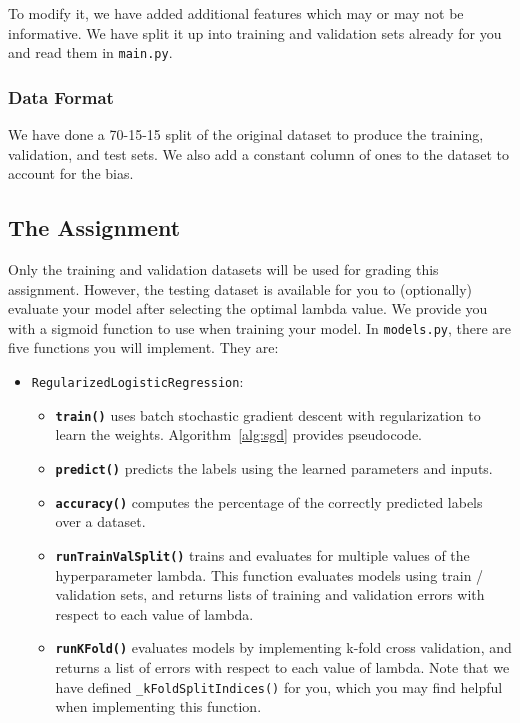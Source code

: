 \documentclass{article}
\begin{document}
To modify it, we have added additional features which may or may not be informative. We have split it up into training and validation sets already for you and read them in \texttt{main.py}.

\subsubsection*{Data Format}

We have done a 70-15-15 split of the original dataset to produce the training, validation, and test sets. We also add a constant column of ones to the dataset to account for the bias.

\subsection*{The Assignment}
Only the training and validation datasets will be used for grading this assignment. However, the testing dataset is available for you to (optionally) evaluate your model after selecting the optimal lambda value.
We provide you with a sigmoid function to use when training your model. In \texttt{models.py}, there are five functions you will implement. They are:

\begin{itemize}
\item \texttt{RegularizedLogisticRegression}:
\begin{itemize}
	\item[\textendash] {\bf \texttt{train()}} uses batch stochastic gradient descent with regularization to learn the weights. Algorithm~\ref{alg:sgd} provides pseudocode.
	\item[\textendash] {\bf \texttt{predict()}} predicts the labels using the learned parameters and inputs.
	\item[\textendash] {\bf \texttt{accuracy()}} computes the percentage of the correctly predicted labels over a dataset.
    \item[\textendash] {\bf \texttt{runTrainValSplit()}} trains and evaluates for multiple values of the hyperparameter lambda. This function evaluates models using train / validation sets, and returns lists of training and validation errors with respect to each value of lambda.
    \item[\textendash] {\bf \texttt{runKFold()}} evaluates models by implementing k-fold cross validation, and returns a list of errors with respect to each value of lambda. Note that we have defined \texttt{\_kFoldSplitIndices()} for you, which you may find helpful when implementing this function.
\end{itemize}

\end{itemize}
\end{document}
